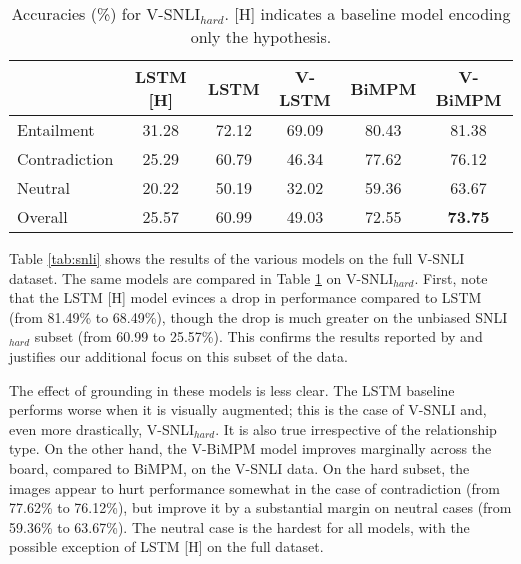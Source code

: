 \documentclass[11pt]{article}
\newcommand{\cut}[1]{}
\begin{document}
\begin{table}
\small
\begin{center}
\begin{tabular}{|l|c||cccc|}
\hline
  & LSTM [H] & LSTM  & V-LSTM  & BiMPM &V-BiMPM  \\\hline
Entailment &  31.28 & 72.12&  69.09  &  80.43 & 81.38 \\
Contradiction & 25.29 & 60.79 &  46.34    & 77.62 & 76.12 \\
Neutral & 20.22 & 50.19 &  32.02 &   59.36 & 63.67\\\hline
Overall & 25.57 & 60.99 &   49.03 &   72.55 & \textbf{73.75} \\
\hline
\end{tabular}
\end{center}
\caption{Accuracies (\%) for V-SNLI$_{hard}$. [H] indicates a baseline model encoding only the hypothesis.} \label{tab:hard}
\end{table}
 

Table \ref{tab:snli} shows the results of the various models on the
full V-SNLI dataset. The same models are compared in Table
\ref{tab:hard} on V-SNLI$_{hard}$. First, note that the LSTM [H] model
evinces a drop in performance compared to LSTM (from 81.49\% to
68.49\%), though the drop is much greater on the unbiased
SNLI$_{hard}$ subset (from 60.99 to 25.57\%). This confirms the results reported by
 and justifies our additional focus on this
subset of the data.

The effect of grounding in these models is less clear. The
LSTM baseline performs worse when it is visually augmented; this is the case of
V-SNLI and, even more drastically, V-SNLI$_{hard}$. It is also true
irrespective of the relationship type. On the other hand, the V-BiMPM
model improves marginally across the board, compared to BiMPM, on the
V-SNLI data. On the hard subset, the images appear to hurt performance
somewhat in the case of contradiction (from 77.62\% to 76.12\%), but
improve it by a substantial margin on neutral cases (from 59.36\% to
63.67\%).  The neutral case is the hardest for all models, with the
possible exception of LSTM [H] on the full dataset.

\cut{H+I A comparison of V-LSTM and V-BiMPM with their counterparts lacking the
premise (the [H+I]) cases shows that, as in the unimodal case,
performance of the grounded model drops when the premise is not
encoded, even in the presence of images. Once again, the drop is
larger on V-SNLI$_{hard}$ in both cases. Thus, the observation that
the premise matters in the TE task, and more so on a dataset that is
relatively free of annotation biases, holds true also of the grounded
case.} 
\end{document}
